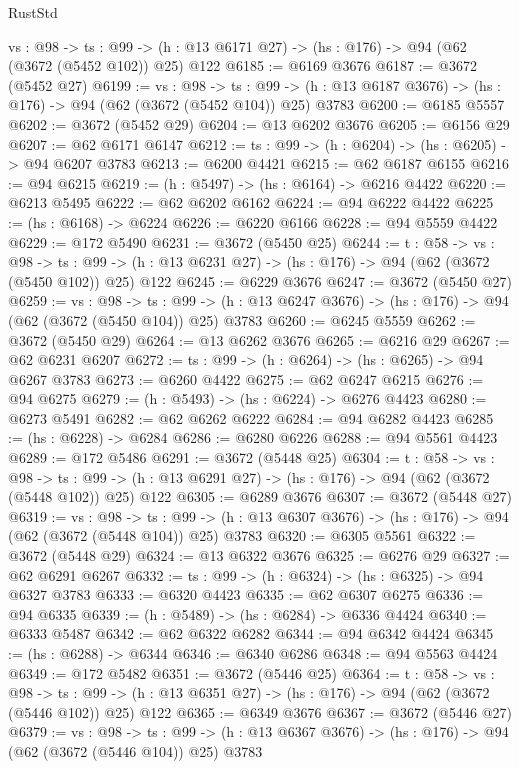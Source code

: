\begin{lexlean}{RustStd}
\begin{coremodule}
  {vs : @98} ->
  {ts : @99} -> (h : @13 @6171 @27) -> (hs : @176) -> @94 (@62 (@3672 (@5452 @102)) @25) @122
@6185 := @6169 @3676
@6187 := @3672 (@5452 @27)
@6199 := {vs : @98} ->
  {ts : @99} -> (h : @13 @6187 @3676) -> (hs : @176) -> @94 (@62 (@3672 (@5452 @104)) @25) @3783
@6200 := @6185 @5557
@6202 := @3672 (@5452 @29)
@6204 := @13 @6202 @3676
@6205 := @6156 @29
@6207 := @62 @6171 @6147
@6212 := {ts : @99} -> (h : @6204) -> (hs : @6205) -> @94 @6207 @3783
@6213 := @6200 @4421
@6215 := @62 @6187 @6155
@6216 := @94 @6215
@6219 := (h : @5497) -> (hs : @6164) -> @6216 @4422
@6220 := @6213 @5495
@6222 := @62 @6202 @6162
@6224 := @94 @6222 @4422
@6225 := (hs : @6168) -> @6224
@6226 := @6220 @6166
@6228 := @94 @5559 @4422
@6229 := @172 @5490
@6231 := @3672 (@5450 @25)
@6244 := {t : @58} ->
  {vs : @98} ->
  {ts : @99} -> (h : @13 @6231 @27) -> (hs : @176) -> @94 (@62 (@3672 (@5450 @102)) @25) @122
@6245 := @6229 @3676
@6247 := @3672 (@5450 @27)
@6259 := {vs : @98} ->
  {ts : @99} -> (h : @13 @6247 @3676) -> (hs : @176) -> @94 (@62 (@3672 (@5450 @104)) @25) @3783
@6260 := @6245 @5559
@6262 := @3672 (@5450 @29)
@6264 := @13 @6262 @3676
@6265 := @6216 @29
@6267 := @62 @6231 @6207
@6272 := {ts : @99} -> (h : @6264) -> (hs : @6265) -> @94 @6267 @3783
@6273 := @6260 @4422
@6275 := @62 @6247 @6215
@6276 := @94 @6275
@6279 := (h : @5493) -> (hs : @6224) -> @6276 @4423
@6280 := @6273 @5491
@6282 := @62 @6262 @6222
@6284 := @94 @6282 @4423
@6285 := (hs : @6228) -> @6284
@6286 := @6280 @6226
@6288 := @94 @5561 @4423
@6289 := @172 @5486
@6291 := @3672 (@5448 @25)
@6304 := {t : @58} ->
  {vs : @98} ->
  {ts : @99} -> (h : @13 @6291 @27) -> (hs : @176) -> @94 (@62 (@3672 (@5448 @102)) @25) @122
@6305 := @6289 @3676
@6307 := @3672 (@5448 @27)
@6319 := {vs : @98} ->
  {ts : @99} -> (h : @13 @6307 @3676) -> (hs : @176) -> @94 (@62 (@3672 (@5448 @104)) @25) @3783
@6320 := @6305 @5561
@6322 := @3672 (@5448 @29)
@6324 := @13 @6322 @3676
@6325 := @6276 @29
@6327 := @62 @6291 @6267
@6332 := {ts : @99} -> (h : @6324) -> (hs : @6325) -> @94 @6327 @3783
@6333 := @6320 @4423
@6335 := @62 @6307 @6275
@6336 := @94 @6335
@6339 := (h : @5489) -> (hs : @6284) -> @6336 @4424
@6340 := @6333 @5487
@6342 := @62 @6322 @6282
@6344 := @94 @6342 @4424
@6345 := (hs : @6288) -> @6344
@6346 := @6340 @6286
@6348 := @94 @5563 @4424
@6349 := @172 @5482
@6351 := @3672 (@5446 @25)
@6364 := {t : @58} ->
  {vs : @98} ->
  {ts : @99} -> (h : @13 @6351 @27) -> (hs : @176) -> @94 (@62 (@3672 (@5446 @102)) @25) @122
@6365 := @6349 @3676
@6367 := @3672 (@5446 @27)
@6379 := {vs : @98} ->
  {ts : @99} -> (h : @13 @6367 @3676) -> (hs : @176) -> @94 (@62 (@3672 (@5446 @104)) @25) @3783

\end{coremodule}
\end{lexlean}
